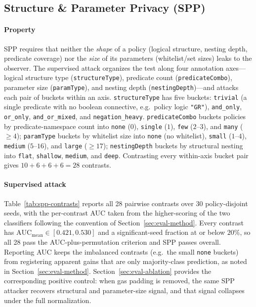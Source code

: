 \subsection{Structure \& Parameter Privacy (SPP)}
\label{sec:eval-spp}

\paragraph{Property} SPP requires that neither the \emph{shape} of a policy (logical structure, nesting depth, predicate coverage) nor the \emph{size} of its parameters (whitelist/set sizes) leaks to the observer. The supervised attack organizes the test along four annotation axes---logical structure type (\texttt{structureType}), predicate count (\texttt{predicateCombo}), parameter size (\texttt{paramType}), and nesting depth (\texttt{nestingDepth})---and attacks each pair of buckets within an axis.
\texttt{structureType} has five buckets: \texttt{trivial} (a single predicate with no boolean connective, e.g.\
policy logic \texttt{"GR"}), \texttt{and\_only}, \texttt{or\_only}, \texttt{and\_or\_mixed},
and \texttt{negation\_heavy}. \texttt{predicateCombo} buckets policies by predicate-namespace count into \texttt{none} ($0$), \texttt{single} ($1$), \texttt{few} ($2$--$3$), and \texttt{many} ($\ge 4$); \texttt{paramType} buckets by whitelist size into \texttt{none} (no whitelist), \texttt{small} ($1$--$4$), \texttt{medium} ($5$--$16$), and \texttt{large} ($\ge 17$); \texttt{nestingDepth} buckets by structural nesting into \texttt{flat}, \texttt{shallow}, \texttt{medium}, and \texttt{deep}. Contrasting every within-axis bucket pair gives $10+6+6+6=28$ contrasts.

\paragraph{Supervised attack} Table~\ref{tab:spp-contrasts} reports all 28 pairwise contrasts over 30 policy-disjoint seeds, with the per-contrast AUC taken from the higher-scoring of the two classifiers following the convention of Section~\ref{sec:eval-method}.
Every contrast has $\mathrm{AUC}_{\text{mean}}\in[0.421,0.530]$ and a significant-seed fraction at or below $20\%$, so all 28 pass the AUC-plus-permutation criterion and SPP passes overall. Reporting AUC keeps the imbalanced contrasts (e.g.\ the small \texttt{none} buckets) from registering apparent gains that are only majority-class prediction, as noted in Section~\ref{sec:eval-method}.
Section~\ref{sec:eval-ablation} provides the corresponding positive control: when gas padding is removed, the same SPP attacker recovers structural and parameter-size signal, and that signal collapses under the full normalization.
